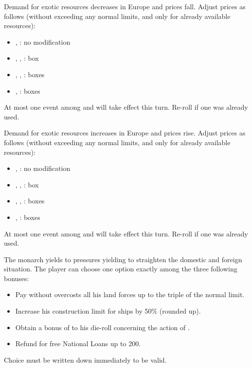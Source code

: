 Demand for exotic resources decreases in Europe and prices fall. Adjust prices
as follows (without exceeding any normal limits, and only for already
available resources):
\begin{itemize}
\item {}, : no modification
\item {}, , :  box
\item {}, , :  boxes
\item {}, :  boxes
\end{itemize}
At most one event among  and
 will take effect this turn. Re-roll if one was
already used.




Demand for exotic resources increases in Europe and prices rise. Adjust prices
as follows (without exceeding any normal limits, and only for already
available resources):
\begin{itemize}
\item {}, : no modification
\item {}, , :  box
\item {}, , :  boxes
\item {}, :  boxes
\end{itemize}

At most one event among  and
 will take effect this turn. Re-roll if one was
already used.




The monarch yields to pressures yielding to straighten the domestic and
foreign situation. The player can choose one option exactly among the three
following bonuses:
\begin{itemize}
\item Pay without overcosts all his land forces up to the triple of the normal
  limit.
\item Increase his construction limit for ships by 50\% (rounded up).
\item Obtain a bonus of  to his die-roll concerning the action of
  .
\item Refund for free National Loans up to 200\ducats.
\end{itemize}
Choice must be written down immediately to be valid.




